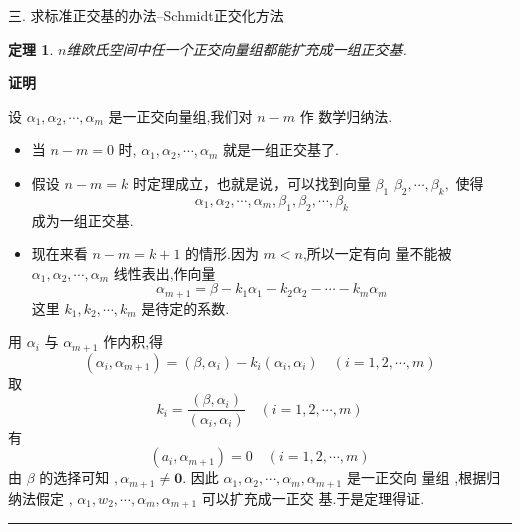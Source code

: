 \documentclass[13pt]{beamer}
\newtheorem{thm}{定理}
\def\qed{\nopagebreak\hfill{\rule{4pt}{7pt}}\medbreak}
\def\pf{{\bf 证明~~ }}
\begin{document}
\begin{frame}
{三. 求标准正交基的办法--Schmidt正交化方法}
\begin{thm}
$n$维欧氏空间中任一个正交向量组都能扩充成一组正交基.
\end{thm}
\pf 
\small{
设 ${\alpha}_{1}, {\alpha}_{2}, \cdots, {\alpha}_{m}$ 是一正交向量组,我们对 $n-m$ 作
数学归纳法.
\begin{itemize}
\item 当 $n-m=0$ 时, ${\alpha}_{1}, {\alpha}
_{2}, \cdots, {\alpha}_{m}$ 就是一组正交基了.

\item 假设 $n-m=k$ 时定理成立，也就是说，可以找到向量 ${\beta}_{1}$
${\beta}_{2}, \cdots, {\beta}_{k},$ 使得
\[
{\alpha}_{1}, {\alpha}_{2}, \cdots, {\alpha}_{m}, {\beta}_{1}, {\beta}_{2}, \cdots, {\beta}_{k}
\]
成为一组正交基. 

\item 现在来看 $n-m=k+1$ 的情形.因为 $m<n$,所以一定有向 量不能被 ${\alpha}_{1}, {\alpha}_{2}, \cdots, {\alpha}_{m}$ 线性表出,作向量
\[
{\alpha}_{m+1}={\beta}-k_{1} {\alpha}_{1}-k_{2} {\alpha}_{2}-\cdots-k_{m} {\alpha}_{m}
\]
这里 $k_{1}, k_{2}, \cdots, k_{m}$ 是待定的系数.
\end{itemize}
}
\end{frame}


\begin{frame}
用 ${\alpha}_{i}$ 与 ${\alpha}_{m+1}$ 作内积,得
\[
\left({\alpha}_{i}, {\alpha}_{m+1}\right)=\left({\beta}, {\alpha}_{i}\right)-k_{i}\left({\alpha}_{i}, {\alpha}_{i}\right) \quad(i=1,2, \cdots, m)
\]
取
\[
k_{i}=\frac{\left({\beta}, {\alpha}_{i}\right)}{\left({\alpha}_{i}, {\alpha}_{i}\right)} \quad(i=1,2, \cdots, m)
\]
有
\[
\left({a}_{i}, {\alpha}_{m+1}\right)=0 \quad(i=1,2, \cdots, m)
\]
由 ${\beta}$ 的选择可知 $, {\alpha}_{m+1} \neq \mathbf{0} .$ 因此 ${\alpha}_{1}, {\alpha}_{2}, \cdots, {\alpha}_{m}, {\alpha}_{m+1}$ 是一正交向
量组 ,根据归纳法假定 , ${\alpha}_{1}, {w}_{2}, \cdots, {\alpha}_{m}, {\alpha}_{m+1}$ 可以扩充成一正交
基.于是定理得证. 
\qed
\end{frame}
\end{document}
